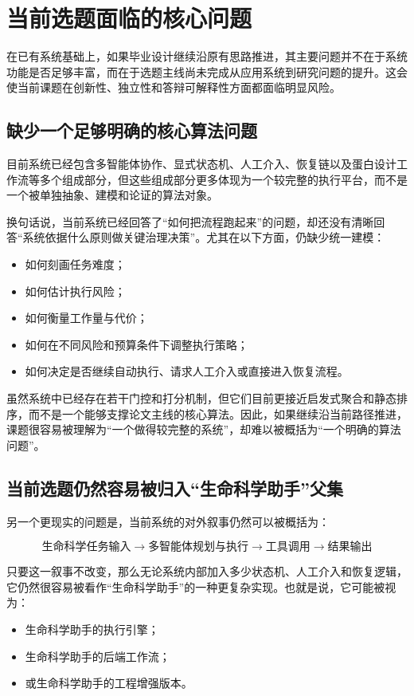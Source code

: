 \section{当前选题面临的核心问题}

在已有系统基础上，如果毕业设计继续沿原有思路推进，其主要问题并不在于系统功能是否足够丰富，而在于选题主线尚未完成从应用系统到研究问题的提升。这会使当前课题在创新性、独立性和答辩可解释性方面都面临明显风险。

\subsection{缺少一个足够明确的核心算法问题}

目前系统已经包含多智能体协作、显式状态机、人工介入、恢复链以及蛋白设计工作流等多个组成部分，但这些组成部分更多体现为一个较完整的执行平台，而不是一个被单独抽象、建模和论证的算法对象。

换句话说，当前系统已经回答了“如何把流程跑起来”的问题，却还没有清晰回答“系统依据什么原则做关键治理决策”。尤其在以下方面，仍缺少统一建模：
\begin{itemize}
	\item 如何刻画任务难度；
	\item 如何估计执行风险；
	\item 如何衡量工作量与代价；
	\item 如何在不同风险和预算条件下调整执行策略；
	\item 如何决定是否继续自动执行、请求人工介入或直接进入恢复流程。
\end{itemize}

虽然系统中已经存在若干门控和打分机制，但它们目前更接近启发式聚合和静态排序，而不是一个能够支撑论文主线的核心算法。因此，如果继续沿当前路径推进，课题很容易被理解为“一个做得较完整的系统”，却难以被概括为“一个明确的算法问题”。

\subsection{当前选题仍然容易被归入“生命科学助手”父集}

另一个更现实的问题是，当前系统的对外叙事仍然可以被概括为：

\[
\texttt{生命科学任务输入}
\rightarrow
\texttt{多智能体规划与执行}
\rightarrow
\texttt{工具调用}
\rightarrow
\texttt{结果输出}
\]

只要这一叙事不改变，那么无论系统内部加入多少状态机、人工介入和恢复逻辑，它仍然很容易被看作“生命科学助手”的一种更复杂实现。也就是说，它可能被视为：
\begin{itemize}
	\item 生命科学助手的执行引擎；
	\item 生命科学助手的后端工作流；
	\item 或生命科学助手的工程增强版本。
\end{itemize}

